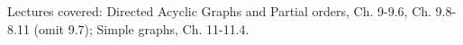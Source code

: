 \documentclass[handout]{mcs}
\begin{document}
\renewcommand{\reading}{ 
\begin{itemize}
\item Chapter~\bref{digraphs_chap}.\ \emph{Directed Graphs}
  through~\bref{partial_order_sec}.~\bref{linear_order_sec}
  through~\bref{prop_summary_sec}. 
\item Chapter~\bref{simple_graphs_chap}.\ \emph{Simple Graphs} through~\bref{isomorphism_sec}.
\end{itemize}
}


\begin{staffnotes}
Lectures covered: Directed Acyclic Graphs and Partial orders,
Ch. 9-9.6, Ch. 9.8-8.11 (omit 9.7);  Simple graphs, Ch. 11-11.4.
\end{staffnotes}




\end{document}
